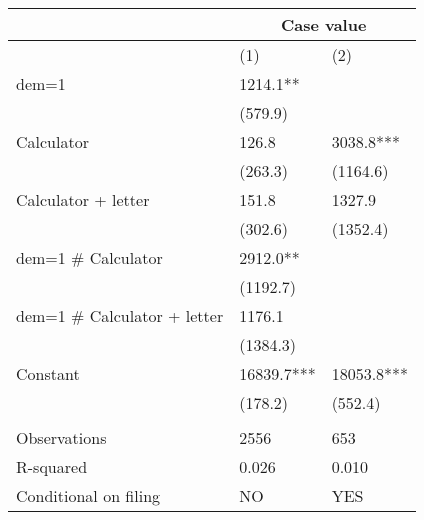 \begin{tabular}{lll}
\toprule
      & \multicolumn{2}{c}{Case value} \\
\midrule
      & (1)   & (2) \\
\midrule
\midrule
dem=1 & 1214.1** &  \\
      & (579.9) &  \\
Calculator & 126.8 & 3038.8*** \\
      & (263.3) & (1164.6) \\
Calculator + letter & 151.8 & 1327.9 \\
      & (302.6) & (1352.4) \\
dem=1 \# Calculator & 2912.0** &  \\
      & (1192.7) &  \\
dem=1 \# Calculator + letter & 1176.1 &  \\
      & (1384.3) &  \\
Constant & 16839.7*** & 18053.8*** \\
      & (178.2) & (552.4) \\
      &       &  \\
\midrule
Observations & 2556  & 653 \\
R-squared & 0.026 & 0.010 \\
Conditional on filing & NO    & YES \\
\bottomrule
\bottomrule
\end{tabular}%
